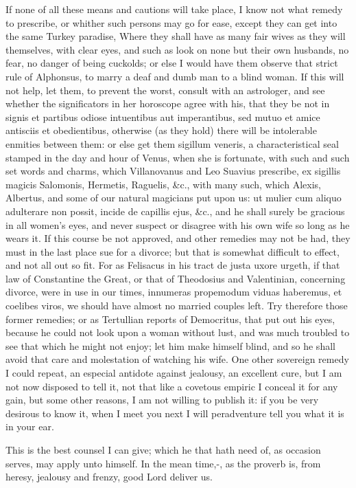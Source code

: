 {If none of all these means and cautions will take place, I know not
what remedy to prescribe, or whither such persons may go for ease,
except they can get into the same Turkey paradise, Where they
shall have as many fair wives as they will themselves, with clear eyes,
and such as look on none but their own husbands, no fear, no danger of
being cuckolds; or else I would have them observe that strict rule of
Alphonsus, to marry a deaf and dumb man to a blind woman. If this
will not help, let them, to prevent the worst, consult with an
astrologer, and see whether the significators in her horoscope
agree with his, that they be not in signis et partibus odiose
intuentibus aut imperantibus, sed mutuo et amice antisciis et
obedientibus, otherwise (as they hold) there will be intolerable
enmities between them: or else get them sigillum veneris, a
characteristical seal stamped in the day and hour of Venus, when she is
fortunate, with such and such set words and charms, which Villanovanus
and Leo Suavius prescribe, ex sigillis magicis Salomonis, Hermetis,
Raguelis, \&c., with many such, which Alexis, Albertus, and some of our
natural magicians put upon us: ut mulier cum aliquo adulterare non
possit, incide de capillis ejus, \&c., and he shall surely be gracious
in all women's eyes, and never suspect or disagree with his own wife so
long as he wears it. If this course be not approved, and other remedies
may not be had, they must in the last place sue for a divorce; but that
is somewhat difficult to effect, and not all out so fit. For as
Felisacus in his tract de justa uxore urgeth, if that law of
Constantine the Great, or that of Theodosius and Valentinian,
concerning divorce, were in use in our times, innumeras propemodum
viduas haberemus, et coelibes viros, we should have almost no married
couples left. Try therefore those former remedies; or as Tertullian
reports of Democritus, that put out his eyes, because he could
not look upon a woman without lust, and was much troubled to see that
which he might not enjoy; let him make himself blind, and so he shall
avoid that care and molestation of watching his wife. One other
sovereign remedy I could repeat, an especial antidote against jealousy,
an excellent cure, but I am not now disposed to tell it, not that like
a covetous empiric I conceal it for any gain, but some other reasons, I
am not willing to publish it: if you be very desirous to know it, when
I meet you next I will peradventure tell you what it is in your ear.

This is the best counsel I can give; which he that hath need of, as
occasion serves, may apply unto himself. In the mean time,-, as the proverb is, from heresy, jealousy
and frenzy, good Lord deliver us.
}
